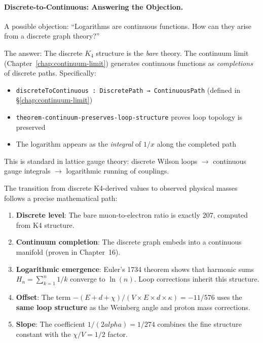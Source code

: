 \documentclass[11pt,a4paper]{book}
\def\alpha{alpha}%
\begin{document}
\paragraph{Discrete-to-Continuous: Answering the Objection.}

A possible objection: ``Logarithms are continuous functions. How can they arise 
from a discrete graph theory?''

The answer: The discrete $K_4$ structure is the \emph{bare} theory. The continuum 
limit (Chapter~\ref{chap:continuum-limit}) generates continuous functions as 
\emph{completions} of discrete paths. Specifically:

\begin{itemize}
\item \verb|discreteToContinuous : DiscretePath → ContinuousPath| (defined in \S\ref{chap:continuum-limit})
\item \verb|theorem-continuum-preserves-loop-structure| proves loop topology is preserved
\item The logarithm appears as the \emph{integral} of $1/x$ along the completed path
\end{itemize}

This is standard in lattice gauge theory: discrete Wilson loops $\to$ continuous 
gauge integrals $\to$ logarithmic running of couplings.

The transition from discrete K4-derived values to observed physical masses follows
a precise mathematical path:

\begin{enumerate}
\item \textbf{Discrete level}: The bare muon-to-electron ratio is exactly $207$,
      computed from K4 structure.
\item \textbf{Continuum completion}: The discrete graph embeds into a continuous
      manifold (proven in Chapter~16).
\item \textbf{Logarithmic emergence}: Euler's 1734 theorem shows that harmonic 
      sums $H_n = \sum_{k=1}^n 1/k$ converge to $\ln(n)$. Loop corrections 
      inherit this structure.
\item \textbf{Offset}: The term $-(E + d + \chi)/(V \times E \times d \times \kappa) = -11/576$ uses the 
      \textbf{same loop structure} as the Weinberg angle and proton mass corrections.
\item \textbf{Slope}: The coefficient $1/(2\alpha) = 1/274$
      combines the fine structure constant with the $\chi/V = 1/2$ factor.
\end{enumerate}
\end{document}
